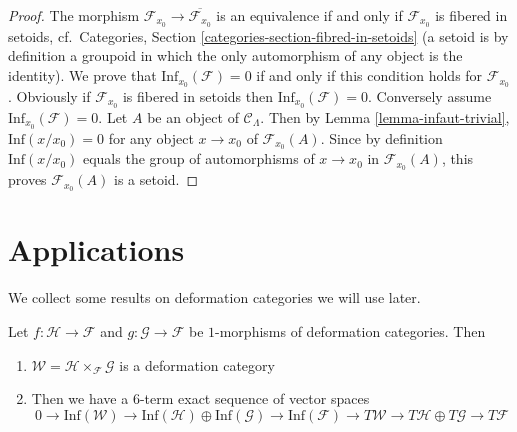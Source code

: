 \begin{proof}
The morphism $\mathcal{F}_{x_0} \to \overline{\mathcal{F}_{x_0}}$ is an
equivalence if and only if $\mathcal{F}_{x_0}$ is fibered in setoids,
cf.\ Categories, Section \ref{categories-section-fibred-in-setoids}
(a setoid is by definition a groupoid in
which the only automorphism of any object is the identity). We prove that
$\text{Inf}_{x_0}(\mathcal{F}) = 0$ if and only if this condition holds
for $\mathcal{F}_{x_0}$.  Obviously if $\mathcal{F}_{x_0}$ is fibered in
setoids then $\text{Inf}_{x_0}(\mathcal{F}) = 0$.  Conversely assume
$\text{Inf}_{x_0}(\mathcal{F}) = 0$.  Let $A$ be an object of
$\mathcal{C}_\Lambda$. Then by
Lemma \ref{lemma-infaut-trivial},
$\text{Inf}(x/x_0) = 0$ for any object $x \to x_0$ of
$\mathcal{F}_{x_0}(A)$. Since by definition $\text{Inf}(x/x_0)$
equals the group of automorphisms of $x \to x_0$ in $\mathcal{F}_{x_0}(A)$,
this proves $\mathcal{F}_{x_0}(A)$ is a setoid.
\end{proof}








\section{Applications}
\label{section-applications}

\noindent
We collect some results on deformation categories we will use later.

\begin{lemma}
\label{lemma-deformation-categories-fiber-product-morphisms}
Let $f : \mathcal{H} \to \mathcal{F}$ and $g : \mathcal{G} \to \mathcal{F}$
be $1$-morphisms of deformation categories. Then
\begin{enumerate}
\item $\mathcal{W} = \mathcal{H} \times_\mathcal{F} \mathcal{G}$ is a
deformation category
\item  Then
we have a $6$-term exact sequence of vector spaces
$$
0 \to \text{Inf}(\mathcal{W})
\to \text{Inf}(\mathcal{H}) \oplus \text{Inf}(\mathcal{G})
\to \text{Inf}(\mathcal{F}) \to
T\mathcal{W} \to T\mathcal{H} \oplus T\mathcal{G} \to T\mathcal{F}
$$
\end{enumerate}
\end{lemma}

